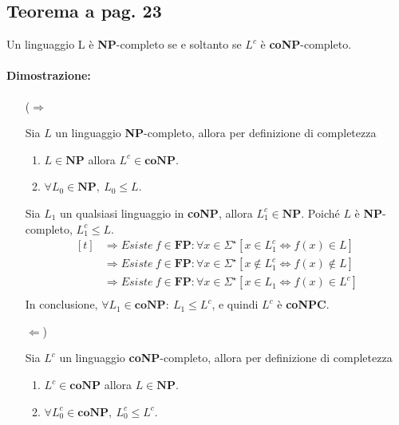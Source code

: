 \subsection{Teorema a pag. 23}

Un linguaggio L è \textbf{NP}-completo se e soltanto se $L^{c}$ è \textbf{coNP}-completo. 

\paragraph*{Dimostrazione: }

\begin{itemize}
    \item [($\Rightarrow$]{
        Sia $L$ un linguaggio \textbf{NP}-completo, allora per definizione di completezza
        \begin{enumerate}
            \item $L \in \textbf{NP}$ allora $L^{c} \in \textbf{coNP}$.
            \item $\forall L_{0} \in \textbf{NP},\ L_{0} \leq L$.
        \end{enumerate}
        Sia $L_{1}$ un qualsiasi linguaggio in \textbf{coNP}, allora $L^{c}_{1} \in \textbf{NP}$. 
        Poiché $L$ è \textbf{NP}-completo, $L_{1}^{c} \leq L$.
        \[
            \begin{aligned}[t]
                &\Rightarrow Esiste\ f \in \textbf{FP}: \forall x \in \Sigma^{\star} [x \in L^{c}_{1} \Leftrightarrow f(x) \in L]\\
                &\Rightarrow Esiste\ f \in \textbf{FP}: \forall x \in \Sigma^{\star} [x \notin L^{c}_{1} \Leftrightarrow f(x) \notin L]\\
                &\Rightarrow Esiste\ f \in \textbf{FP}: \forall x \in \Sigma^{\star} [x \in L_{1} \Leftrightarrow f(x) \in L^{c}]\\
            \end{aligned}
        \]
        In conclusione, $\forall L_{1} \in \textbf{coNP}:\ L_{1} \leq L^{c}$, e quindi $L^{c}$ è \textbf{coNPC}.
    }
    \item [$\Leftarrow$)]{
        Sia $L^{c}$ un linguaggio \textbf{coNP}-completo, allora per definizione di completezza
        \begin{enumerate}
            \item $L^{c} \in \textbf{coNP}$ allora $L \in \textbf{NP}$.
            \item $\forall L_{0}^{c} \in \textbf{coNP},\ L_{0}^{c} \leq L^{c}$.
        \end{enumerate}
}
\end{itemize}
